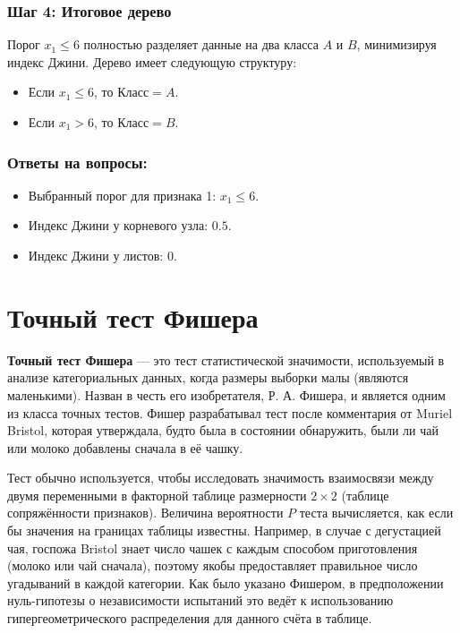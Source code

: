 \begin{solution}
\subsubsection*{Шаг 4: Итоговое дерево}

Порог $x_1 \leq 6$ полностью разделяет данные на два класса $A$ и $B$, минимизируя индекс Джини. Дерево имеет следующую структуру:

\begin{itemize}
    \item Если $x_1 \leq 6$, то $Класс = A$.
    \item Если $x_1 > 6$, то $Класс = B$.
\end{itemize}

\subsubsection*{Ответы на вопросы:}

\begin{itemize}
    \item Выбранный порог для признака 1: $x_1 \leq 6$.
    \item Индекс Джини у корневого узла: $0.5$.
    \item Индекс Джини у листов: $0$.
\end{itemize}
\end{solution}

\section*{Точный тест Фишера}

\textbf{Точный тест Фишера} — это тест статистической значимости, используемый в анализе категориальных данных, когда размеры выборки малы (являются маленькими). Назван в честь его изобретателя, Р. А. Фишера, и является одним из класса точных тестов. Фишер разрабатывал тест после комментария от Muriel Bristol, которая утверждала, будто была в состоянии обнаружить, были ли чай или молоко добавлены сначала в её чашку.

Тест обычно используется, чтобы исследовать значимость взаимосвязи между двумя переменными в факторной таблице размерности $2 \times 2$ (таблице сопряжённости признаков). Величина вероятности $P$ теста вычисляется, как если бы значения на границах таблицы известны. Например, в случае с дегустацией чая, госпожа Bristol знает число чашек с каждым способом приготовления (молоко или чай сначала), поэтому якобы предоставляет правильное число угадываний в каждой категории. Как было указано Фишером, в предположении нуль-гипотезы о независимости испытаний это ведёт к использованию гипергеометрического распределения для данного счёта в таблице.

